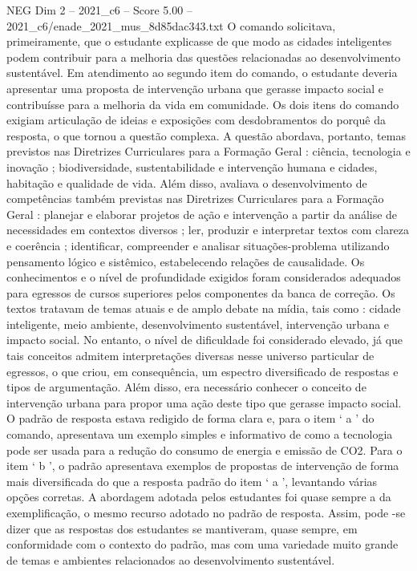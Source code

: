 \begin{textsample}{NEG Dim 2 – 2021\_c6 – Score 5.00 – 2021\_c6/enade\_2021\_mus\_8d85dac343.txt}
O comando solicitava, primeiramente, que o estudante explicasse de que modo as cidades inteligentes podem contribuir para a melhoria das questões relacionadas ao desenvolvimento sustentável.
Em atendimento ao segundo item do comando, o estudante deveria apresentar uma proposta de intervenção urbana que gerasse impacto social e contribuísse para a melhoria da vida em comunidade.
Os dois itens do comando exigiam articulação de ideias e exposições com desdobramentos do porquê da resposta, o que tornou a questão complexa.
A questão abordava, portanto, temas previstos nas Diretrizes Curriculares para a Formação Geral : ciência, tecnologia e inovação ; biodiversidade, sustentabilidade e intervenção humana e cidades, habitação e qualidade de vida.
Além disso, avaliava o desenvolvimento de competências também previstas nas Diretrizes Curriculares para a Formação Geral : planejar e elaborar projetos de ação e intervenção a partir da análise de necessidades em contextos diversos ; ler, produzir e interpretar textos com clareza e coerência ; identificar, compreender e analisar situações-problema utilizando pensamento lógico e sistêmico, estabelecendo relações de causalidade.
Os conhecimentos e o nível de profundidade exigidos foram considerados adequados para egressos de cursos superiores pelos componentes da banca de correção.
Os textos tratavam de temas atuais e de amplo debate na mídia, tais como : cidade inteligente, meio ambiente, desenvolvimento sustentável, intervenção urbana e impacto social.
No entanto, o nível de dificuldade foi considerado elevado, já que tais conceitos admitem interpretações diversas nesse universo particular de egressos, o que criou, em consequência, um espectro diversificado de respostas e tipos de argumentação.
Além disso, era necessário conhecer o conceito de intervenção urbana para propor uma ação deste tipo que gerasse impacto social.
O padrão de resposta estava redigido de forma clara e, para o item ‘ a ’ do comando, apresentava um exemplo simples e informativo de como a tecnologia pode ser usada para a redução do consumo de energia e emissão de CO2.
Para o item ‘ b ’, o padrão apresentava exemplos de propostas de intervenção de forma mais diversificada do que a resposta padrão do item ‘ a ’, levantando várias opções corretas.
A abordagem adotada pelos estudantes foi quase sempre a da exemplificação, o mesmo recurso adotado no padrão de resposta.
Assim, pode -se dizer que as respostas dos estudantes se mantiveram, quase sempre, em conformidade com o contexto do padrão, mas com uma variedade muito grande de temas e ambientes relacionados ao desenvolvimento sustentável.

\end{textsample}
